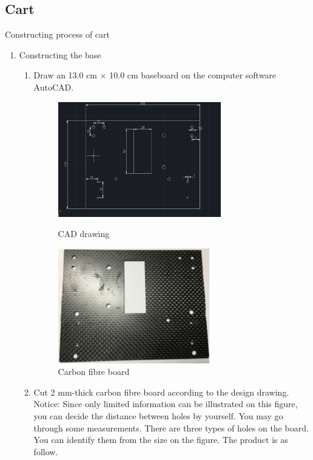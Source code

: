 %
%

\newpage

\subsection{Cart}
Constructing process of cart
\begin{enumerate}
\item Constructing the base
	\begin{enumerate}
	\item	Draw an 13.0 cm $\times$ 10.0 cm baseboard on the computer software AutoCAD.
	\begin{figure}[H]
	\begin{minipage}{0.48\textwidth}
	\centering
	\includegraphics[height=5cm]{figure/procedure/p1}
 	\caption{CAD drawing \label{fig:cad}}
	\end{minipage}
	\begin{minipage}{0.48\textwidth}
	\centering
	\includegraphics[height=5cm]{figure/procedure/p2}
 	\caption{Carbon fibre board \label{fig:carbonFiberBoard}}
	\end{minipage}
	\end{figure}
	\item Cut 2 mm-thick carbon fibre board according to the design drawing. Notice: Since only limited information can be illustrated on this figure, you can decide the distance between holes by yourself. You may go through some measurements. There are three types of holes on the board. You can identify them from the size on the figure. The product is as follow. 

\end{enumerate}
\end{enumerate}
